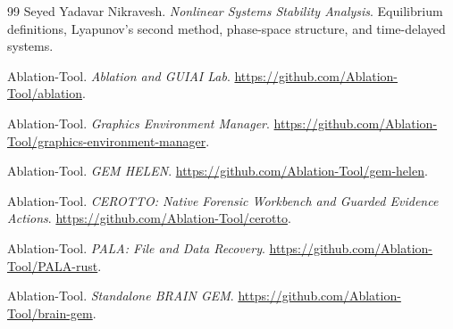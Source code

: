 \begin{thebibliography}{99}
Seyed Yadavar Nikravesh.
\newblock \emph{Nonlinear Systems Stability Analysis}.
\newblock Equilibrium definitions, Lyapunov's second method, phase-space structure, and time-delayed systems.

Ablation-Tool.
\newblock \emph{Ablation and GUIAI Lab}.
\newblock \url{https://github.com/Ablation-Tool/ablation}.

Ablation-Tool.
\newblock \emph{Graphics Environment Manager}.
\newblock \url{https://github.com/Ablation-Tool/graphics-environment-manager}.

Ablation-Tool.
\newblock \emph{GEM HELEN}.
\newblock \url{https://github.com/Ablation-Tool/gem-helen}.

Ablation-Tool.
\newblock \emph{CEROTTO: Native Forensic Workbench and Guarded Evidence Actions}.
\newblock \url{https://github.com/Ablation-Tool/cerotto}.

Ablation-Tool.
\newblock \emph{PALA: File and Data Recovery}.
\newblock \url{https://github.com/Ablation-Tool/PALA-rust}.

Ablation-Tool.
\newblock \emph{Standalone BRAIN GEM}.
\newblock \url{https://github.com/Ablation-Tool/brain-gem}.

\end{thebibliography}
